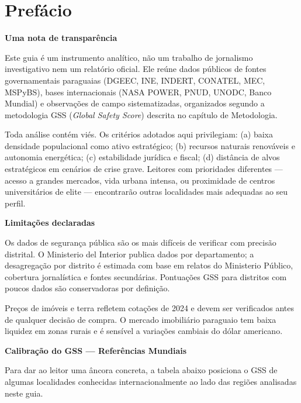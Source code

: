 \chapter*{Prefácio}\label{prefacio}

\textbf{Uma nota de transparência}

Este guia é um instrumento analítico, não um trabalho de jornalismo investigativo nem um relatório oficial. Ele reúne dados públicos de fontes governamentais paraguaias (DGEEC, INE, INDERT, CONATEL, MEC, MSPyBS), bases internacionais (NASA POWER, PNUD, UNODC, Banco Mundial) e observações de campo sistematizadas, organizados segundo a metodologia GSS (\textit{Global Safety Score}) descrita no capítulo de Metodologia.

Toda análise contém viés. Os critérios adotados aqui privilegiam: (a) baixa densidade populacional como ativo estratégico; (b) recursos naturais renováveis e autonomia energética; (c) estabilidade jurídica e fiscal; (d) distância de alvos estratégicos em cenários de crise grave. Leitores com prioridades diferentes --- acesso a grandes mercados, vida urbana intensa, ou proximidade de centros universitários de elite --- encontrarão outras localidades mais adequadas ao seu perfil.

\medskip

\textbf{Limitações declaradas}

Os dados de segurança pública são os mais difíceis de verificar com precisão distrital. O Ministerio del Interior publica dados por departamento; a desagregação por distrito é estimada com base em relatos do Ministerio Público, cobertura jornalística e fontes secundárias. Pontuações GSS para distritos com poucos dados são conservadoras por definição.

Preços de imóveis e terra refletem cotações de 2024 e devem ser verificados antes de qualquer decisão de compra. O mercado imobiliário paraguaio tem baixa liquidez em zonas rurais e é sensível a variações cambiais do dólar americano.

\medskip

\textbf{Calibração do GSS --- Referências Mundiais}

Para dar ao leitor uma âncora concreta, a tabela abaixo posiciona o GSS de algumas localidades conhecidas internacionalmente ao lado das regiões analisadas neste guia.

